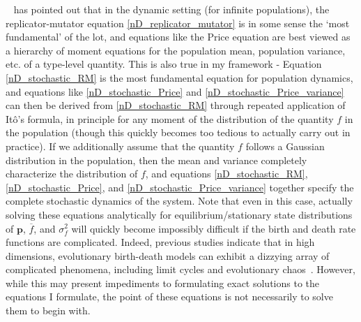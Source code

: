 ~\cite{lion_theoretical_2018} has pointed out that in the dynamic setting (for infinite populations), the replicator-mutator equation \eqref{nD_replicator_mutator} is in some sense the `most fundamental' of the lot, and equations like the Price equation are best viewed as a hierarchy of moment equations for the population mean, population variance, etc. of a type-level quantity. This is also true in my framework - Equation \eqref{nD_stochastic_RM} is the most fundamental equation for population dynamics, and equations like \eqref{nD_stochastic_Price} and \eqref{nD_stochastic_Price_variance} can then be derived from \eqref{nD_stochastic_RM} through repeated application of It\^o's formula, in principle for any moment of the distribution of the quantity $f$ in the population (though this quickly becomes too tedious to actually carry out in practice). If we additionally assume that the quantity $f$ follows a Gaussian distribution in the population, then the mean and variance completely characterize the distribution of $f$, and equations \eqref{nD_stochastic_RM}, \eqref{nD_stochastic_Price}, and \eqref{nD_stochastic_Price_variance} together specify the complete stochastic dynamics of the system. Note that even in this case, actually solving these equations analytically for equilibrium/stationary state distributions of $\mathbf{p}$, $\overline{f}$, and $\sigma^2_f$ will quickly become impossibly difficult if the birth and death rate functions are complicated. Indeed, previous studies indicate that in high dimensions, evolutionary birth-death models can exhibit a dizzying array of complicated phenomena, including limit cycles and evolutionary chaos~\citep{doebeli_diversity_2017}. However, while this may present impediments to formulating exact solutions to the equations I formulate, the point of these equations is not necessarily to solve them to begin with.

